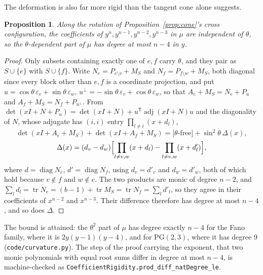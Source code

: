 \documentclass[11pt]{article}
\newtheorem{proposition}[theorem]{Proposition}
\theoremstyle{remark}
\begin{document}
The deformation is also far more rigid than the tangent cone alone suggests.

\begin{proposition}\label{prop:rigid}
Along the rotation of Proposition~\ref{prop:cone}'s cross configuration, the coefficients of
$y^{n},y^{n-1},y^{n-2},y^{n-3}$ in $\mu$ are independent of $\theta$, so the $\theta$-dependent
part of $\mu$ has degree at most $n-4$ in $y$.
\end{proposition}

\begin{proof}
Only subsets containing exactly one of $e,f$ carry $\theta$, and they pair as $S\cup\{e\}$ with
$S\cup\{f\}$. Write $N_e=P_{e\setminus v}+M_S$ and $N_f=P_{f\setminus w}+M_S$, both diagonal since
every block other than $e,f$ is a coordinate projection, and put $u=\cos\theta\,\varepsilon_v+
\sin\theta\,\varepsilon_w$, $u^{\perp}=-\sin\theta\,\varepsilon_v+\cos\theta\,\varepsilon_w$, so
that $A_e+M_S=N_e+P_u$ and $A_f+M_S=N_f+P_{u^\perp}$. From
$\det(xI+N+P_u)=\det(xI+N)+u^{\mathsf T}\operatorname{adj}(xI+N)u$ and the diagonality of $N$,
whose adjugate has $(i,i)$ entry $\prod_{l\neq i}(x+d_l)$,
\[
\det(xI+A_e+M_S)+\det(xI+A_f+M_S)=\bigl[\theta\text{-free}\bigr]
+\sin^2\theta\,\Delta(x),
\]
\[
\Delta(x)=(d_v-d_w)\Bigl[\prod_{l\neq v,w}(x+d_l)-\prod_{l\neq v,w}(x+d'_l)\Bigr],
\]
where $d=\operatorname{diag}N_e$, $d'=\operatorname{diag}N_f$, using $d_v=d'_v$ and $d_w=d'_w$,
both of which hold because $v\notin f$ and $w\notin e$. The two products are monic of degree
$n-2$, and $\sum_ld_l=\operatorname{tr}N_e=(b-1)+\operatorname{tr}M_S=\operatorname{tr}N_f=
\sum_ld'_l$, so they agree in their coefficients of $x^{n-2}$ and $x^{n-3}$. Their difference
therefore has degree at most $n-4$, and so does $\Delta$.
\end{proof}

The bound is attained: the $\theta^2$ part of $\mu$ has degree exactly $n-4$ for the Fano family,
where it is $2y(y-1)(y-4)$, and for $\mathrm{PG}(2,3)$, where it has degree $9$
(\texttt{code/curvature.py}). The step of the proof carrying the exponent, that two monic
polynomials with equal root sums differ in degree at most $n-4$, is machine-checked as
\texttt{CoefficientRigidity.prod\_diff\_natDegree\_le}.
\end{document}
